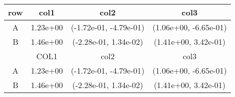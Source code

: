 \begin{tabular}{cccc}
\toprule
row&col1&col2&col3\tabularnewline
\midrule
A&1.23e+00& (-1.72e-01, -4.79e-01)& (1.06e+00, -6.65e-01)\tabularnewline
B&1.46e+00& (-2.28e-01, 1.34e-02)& (1.41e+00, 3.42e-01)\tabularnewline
\midrule
&COL1&col2&col3\tabularnewline
\midrule
A&1.23e+00& (-1.72e-01, -4.79e-01)& (1.06e+00, -6.65e-01)\tabularnewline
B&1.46e+00& (-2.28e-01, 1.34e-02)& (1.41e+00, 3.42e-01)\tabularnewline
\bottomrule
\end{tabular}
